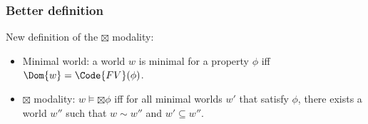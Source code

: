 \begin{frame}[fragile]
    \frametitle{Better definition}

    
New definition of the $\boxtimes$ modality:
\begin{itemize}
    \item Minimal world: a world $w$ is minimal for a property $\phi$ iff $\Dom{w} = \Code{FV}(\phi)$.
    \item $\boxtimes$ modality: $w \models \boxtimes \phi$ iff for all minimal worlds $w'$ that satisfy $\phi$, there exists a world $w''$ such that $w \sim w''$ and $w' \subseteq w''$.
\end{itemize}

\end{frame}

